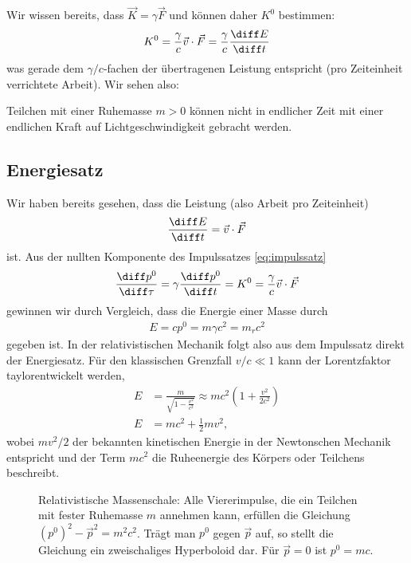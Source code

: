 Wir wissen bereits, dass $\vec K=\gamma \vec F$ und können daher $K^0$ bestimmen:
\begin{align*}
    K^0 = \frac{\gamma}{c}\vec v\cdot \vec F= \frac{\gamma}{c} \frac{\diff E}{\diff t}
\end{align*}
was gerade dem $\gamma/c$-fachen der übertragenen Leistung entspricht (pro Zeiteinheit verrichtete Arbeit). Wir sehen also:
\begin{formal}
    Teilchen mit einer Ruhemasse $m>0$ können nicht in endlicher Zeit mit einer endlichen Kraft auf Lichtgeschwindigkeit gebracht werden\footnotemark.
\end{formal}



\subsection{Energiesatz}

Wir haben bereits gesehen, dass die Leistung (also Arbeit pro Zeiteinheit)
\begin{align*}
    \frac{\diff E}{\diff t} = \vec v\cdot\vec F
\end{align*}
ist. Aus der nullten Komponente des Impulssatzes \eqref{eq:impulssatz}
\begin{align*}
    \frac{\diff p^0}{\diff\tau} = \gamma \frac{\diff p^0}{\diff t}=K^0= \frac{\gamma}{c}\vec v\cdot \vec F
\end{align*}
gewinnen wir durch Vergleich, dass die Energie einer Masse durch
\begin{align*}
    \boxed{E=cp^0=m\gamma c^2 = m_r c^2 }
\end{align*}
gegeben ist. In der relativistischen Mechanik folgt also aus dem Impulssatz direkt der Energiesatz.
Für den klassischen Grenzfall $v/c\ll 1$ kann der Lorentzfaktor taylorentwickelt werden,
\begin{align*}
    E & =\frac{m}{\sqrt{1-\frac{v^2}{c^2}}} \approx mc^2\left(1+\frac{v^2}{2c^2}\right) \\
    E & = mc^2 + \frac{1}{2}mv^2,
\end{align*}
wobei $mv^2/2$ der bekannten kinetischen Energie in der Newtonschen Mechanik entspricht und der Term $mc^2$ die Ruheenergie des Körpers oder Teilchens beschreibt.

\begin{figure}[htb]
    \centering
    \tfigMassenschale
    \caption{Relativistische Massenschale: Alle Viererimpulse, die ein Teilchen mit fester Ruhemasse $m$ annehmen kann, erfüllen die Gleichung $\left(p^0\right)^2-\vec p^2=m^2 c^2$. Trägt man $p^0$ gegen $\vec p$ auf, so stellt die Gleichung ein zweischaliges Hyperboloid dar. Für $\vec p=0$ ist $p^0=mc$. }
    \label{fig:massenschale}
\end{figure}

